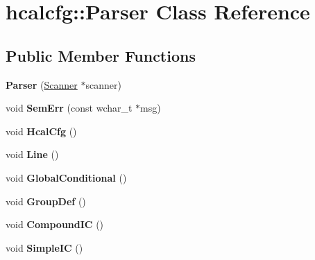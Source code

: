 \hypertarget{classhcalcfg_1_1Parser}{\section{hcalcfg\-:\-:Parser Class Reference}
\label{classhcalcfg_1_1Parser}
}
\subsection*{Public Member Functions}
\begin{DoxyCompactItemize}
\item 
\hypertarget{classhcalcfg_1_1Parser_a8d9293499bffa2afca86df359dfb4fbf}{{\bfseries Parser} (\hyperlink{classhcalcfg_1_1Scanner}{Scanner} $\ast$scanner)}\label{classhcalcfg_1_1Parser_a8d9293499bffa2afca86df359dfb4fbf}

\item 
\hypertarget{classhcalcfg_1_1Parser_a5f92e06aec420485a4530d2da45e1e00}{void {\bfseries Sem\-Err} (const wchar\-\_\-t $\ast$msg)}\label{classhcalcfg_1_1Parser_a5f92e06aec420485a4530d2da45e1e00}

\item 
\hypertarget{classhcalcfg_1_1Parser_ad5f7b94128a1804bae0d02618238c9f6}{void {\bfseries Hcal\-Cfg} ()}\label{classhcalcfg_1_1Parser_ad5f7b94128a1804bae0d02618238c9f6}

\item 
\hypertarget{classhcalcfg_1_1Parser_a967925b9ca68f60cfb7a133851c2c442}{void {\bfseries Line} ()}\label{classhcalcfg_1_1Parser_a967925b9ca68f60cfb7a133851c2c442}

\item 
\hypertarget{classhcalcfg_1_1Parser_ab4c4f7f234fea3c4f9ee8004123288a3}{void {\bfseries Global\-Conditional} ()}\label{classhcalcfg_1_1Parser_ab4c4f7f234fea3c4f9ee8004123288a3}

\item 
\hypertarget{classhcalcfg_1_1Parser_a18f5fcbd06a829818654f24379c13e59}{void {\bfseries Group\-Def} ()}\label{classhcalcfg_1_1Parser_a18f5fcbd06a829818654f24379c13e59}

\item 
\hypertarget{classhcalcfg_1_1Parser_a6f193b9198c8834fea5f2125390be5b3}{void {\bfseries Compound\-I\-C} ()}\label{classhcalcfg_1_1Parser_a6f193b9198c8834fea5f2125390be5b3}

\item 
\hypertarget{classhcalcfg_1_1Parser_a51ddf3d7fc2a96ba699ee6bbe747f817}{void {\bfseries Simple\-I\-C} ()}\label{classhcalcfg_1_1Parser_a51ddf3d7fc2a96ba699ee6bbe747f817}


\end{DoxyCompactItemize}
